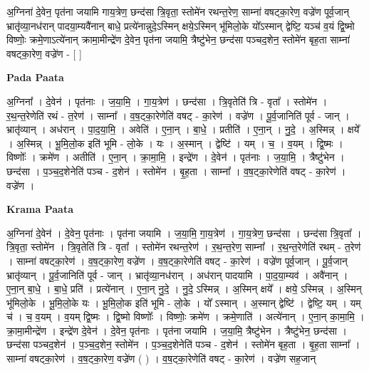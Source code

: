 \documentclass[17pt]{extarticle}
\begin{document}
अ॒ग्निना॑ दे॒वेन॒ पृत॑ना जयामि गाय॒त्रेण॒ छन्द॑सा त्रि॒वृता॒ स्तोमे॑न रथन्त॒रेण॒ साम्ना॑ वषट्का॒रेण॒ वज्रे॑ण पूर्व॒जान् भ्रातृ॑व्या॒नध॑रान् पादया॒म्यवै॑नान् बाधे॒ प्रत्ये॑नान्नुदे॒ऽस्मिन् क्षये॒ऽस्मिन् भू॑मिलो॒के यो᳚ऽस्मान् द्वेष्टि॒ यञ्च॑ व॒यं द्वि॒ष्मो विष्णोः॒ क्रमे॒णाऽत्ये॑नान् क्रामा॒मीन्द्रे॑ण दे॒वेन॒ पृत॑ना जयामि॒ त्रैष्टु॑भेन॒ छन्द॑सा पञ्चद॒शेन॒ स्तोमे॑न बृह॒ता साम्ना॑ वषट्का॒रेण॒ वज्रे॑ण - [  ] \newline

\textbf{Pada Paata} \newline

अ॒ग्निना᳚ । दे॒वेन॑ । पृत॑नाः । ज॒या॒मि॒ । गा॒य॒त्रेण॑ । छन्द॑सा । त्रि॒वृतेति॑ त्रि - वृता᳚ । स्तोमे॑न । र॒थ॒न्त॒रेणेति॑ रथं - त॒रेण॑ । साम्ना᳚ । व॒ष॒ट्का॒रेणेति॑ वषट् - का॒रेण॑ । वज्रे॑ण । पू॒र्व॒जानिति॑ पूर्व - जान् । भ्रातृ॑व्यान् । अध॑रान् । पा॒द॒या॒मि॒ । अवेति॑ । ए॒ना॒न् । बा॒धे॒ । प्रतीति॑ । ए॒ना॒न् । नु॒दे॒ । अ॒स्मिन्न् । क्षये᳚ । अ॒स्मिन्न् । भू॒मि॒लो॒क इति॑ भूमि - लो॒के । यः । अ॒स्मान् । द्वेष्टि॑ । यम् । च॒ । व॒यम् । द्वि॒ष्मः । विष्णोः᳚ । क्रमे॑ण । अतीति॑ । ए॒ना॒न् । क्रा॒मा॒मि॒ । इन्द्रे॑ण । दे॒वेन॑ । पृत॑नाः । ज॒या॒मि॒ । त्रैष्टु॑भेन । छन्द॑सा । प॒ञ्च॒द॒शेनेति॑ पञ्च - द॒शेन॑ । स्तोमे॑न । बृ॒ह॒ता । साम्ना᳚ । व॒ष॒ट्का॒रेणेति॑ वषट् - का॒रेण॑ । वज्रे॑ण ।  \newline


\textbf{Krama Paata} \newline

अ॒ग्निना॑ दे॒वेन॑ । दे॒वेन॒ पृत॑नाः । पृत॑ना जयामि । ज॒या॒मि॒ गा॒य॒त्रेण॑ । गा॒य॒त्रेण॒ छन्द॑सा । छन्द॑सा त्रि॒वृता᳚ । त्रि॒वृता॒ स्तोमे॑न । त्रि॒वृतेति॑ त्रि - वृता᳚ । स्तोमे॑न रथन्त॒रेण॑ । र॒थ॒न्त॒रेण॒ साम्ना᳚ । र॒थ॒न्त॒रेणेति॑ रथम् - त॒रेण॑ । साम्ना॑ वषट्का॒रेण॑ । व॒ष॒ट्का॒रेण॒ वज्रे॑ण । व॒ष॒ट्का॒रेणेति॑ वषट् - का॒रेण॑ । वज्रे॑ण पूर्व॒जान् । पू॒र्व॒जान् भ्रातृ॑व्यान् । पू॒र्व॒जानिति॑ पूर्व - जान् । भ्रातृ॑व्या॒नध॑रान् । अध॑रान् पादयामि । पा॒द॒या॒म्यव॑ । अवै॑नान् । ए॒ना॒न् बा॒धे॒ । बा॒धे॒ प्रति॑ । प्रत्ये॑नान् । ए॒ना॒न् नु॒दे॒ । नु॒दे॒ ऽस्मिन्न् । अ॒स्मिन् क्षये᳚ । क्षये॒ ऽस्मिन्न् । अ॒स्मिन् भू॑मिलो॒के । भू॒मि॒लो॒के यः । भू॒मि॒लो॒क इति॑ भूमि - लो॒के । यो᳚ ऽस्मान् । अ॒स्मान् द्वेष्टि॑ । द्वेष्टि॒ यम् । यम् च॑ । च॒ व॒यम् । व॒यम् द्वि॒ष्मः । द्वि॒ष्मो विष्णोः᳚ । विष्णोः॒ क्रमे॑ण । क्रमे॒णाति॑ । अत्ये॑नान् । ए॒ना॒न् का॒मा॒मि॒ । क्रा॒मा॒मीन्द्रे॑ण । इन्द्रे॑ण दे॒वेन॑ । दे॒वेन॒ पृत॑नाः । पृत॑ना जयामि । ज॒या॒मि॒ त्रैष्टु॑भेन । त्रैष्टु॑भेन॒ छन्द॑सा । छन्द॑सा पञ्चद॒शेन॑ । प॒ञ्च॒द॒शेन॒ स्तोमे॑न । प॒ञ्च॒द॒शेनेति॑ पञ्च - द॒शेन॑ । स्तोमे॑न बृह॒ता । बृ॒ह॒ता साम्ना᳚ । साम्ना॑ वषट्का॒रेण॑ । व॒ष॒ट्का॒रेण॒ वज्रे॑ण ( ) । व॒ष॒ट्का॒रेणेति॑ वषट् - का॒रेण॑ । वज्रे॑ण सह॒जान् \newline
\end{document}
